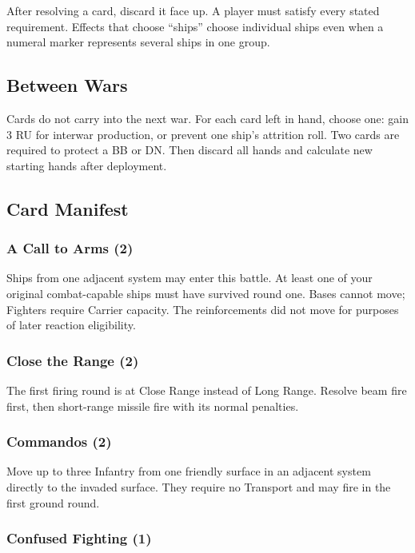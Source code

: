 After resolving a card, discard it face up. A player must satisfy every stated
requirement. Effects that choose ``ships'' choose individual ships even when a
numeral marker represents several ships in one group.

\subsection{Between Wars}

Cards do not carry into the next war. For each card left in hand, choose one:
gain 3 RU for interwar production, or prevent one ship's attrition roll. Two
cards are required to protect a BB or DN. Then discard all hands and calculate
new starting hands after deployment.

\subsection{Card Manifest}

\subsubsection{A Call to Arms (2)}

 Ships from one adjacent
system may enter this battle. At least one of your original combat-capable
ships must have survived round one. Bases cannot move; Fighters require
Carrier capacity. The reinforcements did not move for purposes of later
reaction eligibility.

\subsubsection{Close the Range (2)}

 The first firing
round is at Close Range instead of Long Range. Resolve beam fire first, then
short-range missile fire with its normal penalties.

\subsubsection{Commandos (2)}

 Move up to three Infantry
from one friendly surface in an adjacent system directly to the invaded
surface. They require no Transport and may fire in the first ground round.

\subsubsection{Confused Fighting (1)}

